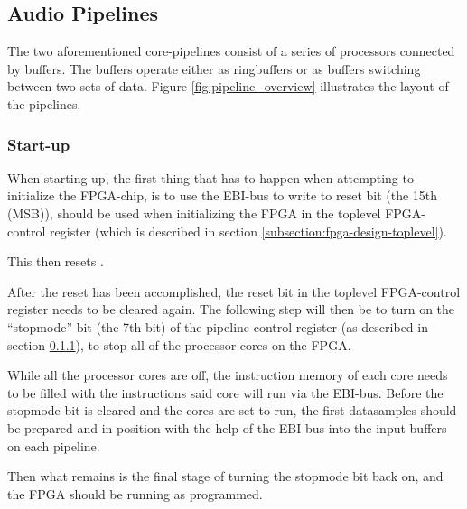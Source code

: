 \FloatBarrier
\subsection{Audio Pipelines}\label{sec:audio_pipelines}


The two aforementioned core-pipelines consist of a series of processors
connected by buffers. The buffers operate either as ringbuffers or as buffers
switching between two sets of data.
Figure \ref{fig:pipeline_overview} illustrates the
layout of the pipelines.

\subsubsection{Start-up}\label{subsection:fpga-pipeline-startup}


When starting up, the first thing that has to happen when attempting to
initialize the FPGA-chip, is to use the EBI-bus to write to reset bit (the 15th
(MSB)), should be used when initializing the FPGA in the toplevel
FPGA-control register (which is described in section
\ref{subsection:fpga-design-toplevel}).

This then resets .

After the reset has been accomplished, the reset bit in the toplevel
FPGA-control register needs to be cleared again. The following step will then be
to turn on the ``stopmode'' bit (the 7th bit) of the pipeline-control
register (as described in section \ref{subsection:fpga-pipeline-startup}),
to stop all of the processor cores on the FPGA.

While all the processor cores are off, the instruction memory of each core needs
to be filled with the instructions said core will run via the EBI-bus. Before
the stopmode bit is cleared and the cores are set to run, the first datasamples
should be prepared and in position with the help of the EBI bus into the input
buffers on each pipeline.

Then what remains is the final stage of turning the stopmode bit back on, and
the FPGA should be running as programmed.

